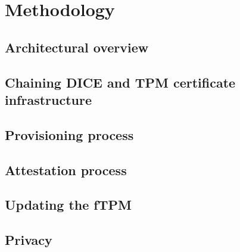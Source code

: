 
\chapter{Methodology}\label{chapter:methodology}

\section{Architectural overview}


\section{Chaining DICE and TPM certificate infrastructure}

\section{Provisioning process}


\section{Attestation process}


\section{Updating the fTPM}


\section{Privacy}

